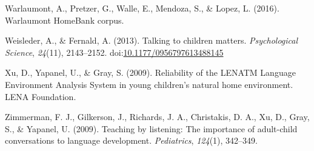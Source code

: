\documentclass[english,floatsintext,man]{apa6}
\begin{document}
\hypertarget{ref-warlaumont2016warlaumont}{}
Warlaumont, A., Pretzer, G., Walle, E., Mendoza, S., \& Lopez, L.
(2016). Warlaumont HomeBank corpus.

\hypertarget{ref-Weisleder2013a}{}
Weisleder, A., \& Fernald, A. (2013). Talking to children matters.
\emph{Psychological Science}, \emph{24}(11), 2143--2152.
doi:\href{https://doi.org/10.1177/0956797613488145}{10.1177/0956797613488145}

\hypertarget{ref-Xu2009a}{}
Xu, D., Yapanel, U., \& Gray, S. (2009). Reliability of the LENATM
Language Environment Analysis System in young children's natural home
environment. LENA Foundation.

\hypertarget{ref-zimmerman2009}{}
Zimmerman, F. J., Gilkerson, J., Richards, J. A., Christakis, D. A., Xu,
D., Gray, S., \& Yapanel, U. (2009). Teaching by listening: The
importance of adult-child conversations to language development.
\emph{Pediatrics}, \emph{124}(1), 342--349.
\end{document}

